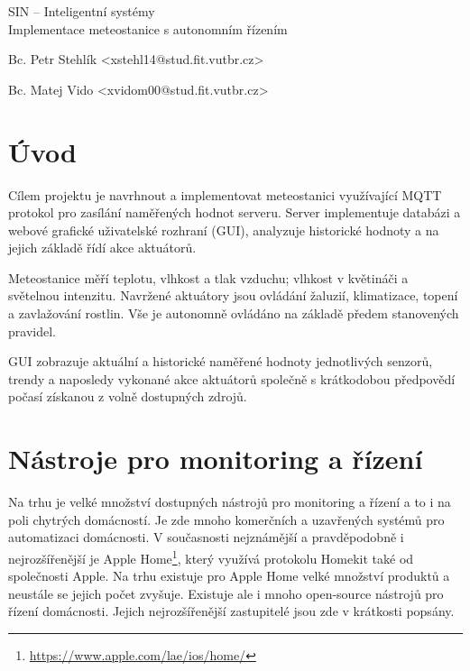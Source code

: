 \documentclass[11pt,a4paper]{article}
\begin{document}
\begin{center}
	\LARGE{SIN -- Inteligentní systémy}\\
	\Large{Implementace meteostanice s autonomním řízením}
	\vspace{0.5cm}

    \begin{centering}
        \small{Bc. Petr Stehlík <xstehl14@stud.fit.vutbr.cz>}
    \end{centering}

    \begin{centering}
        \small{Bc. Matej Vido <xvidom00@stud.fit.vutbr.cz>}
    \end{centering}

	\vspace{0.2cm}

\end{center}

\section{Úvod}
Cílem projektu je navrhnout a implementovat meteostanici využívající MQTT protokol pro zasílání naměřených hodnot serveru. Server implementuje databázi a webové grafické uživatelské rozhraní (GUI), analyzuje historické hodnoty a na jejich základě řídí akce aktuátorů.

Meteostanice měří teplotu, vlhkost a tlak vzduchu; vlhkost v květináči a světelnou intenzitu. Navržené aktuátory jsou ovládání žaluzií, klimatizace, topení a zavlažování rostlin. Vše je autonomně ovládáno na základě předem stanovených pravidel.

GUI zobrazuje aktuální a historické naměřené hodnoty jednotlivých senzorů, trendy a naposledy vykonané akce aktuátorů společně s krátkodobou předpovědí počasí získanou z volně dostupných zdrojů.

\section{Nástroje pro monitoring a řízení}
Na trhu je velké množství dostupných nástrojů pro monitoring a řízení a to i na poli chytrých domácností. Je zde mnoho komerčních a uzavřených systémů pro automatizaci domácnosti. V současnosti nejznámější a pravděpodobně i nejrozšířenější je Apple Home\footnote{\url{https://www.apple.com/lae/ios/home/}}, který využívá protokolu Homekit také od společnosti Apple. Na trhu existuje pro Apple Home velké množství produktů a neustále se jejich počet zvyšuje. Existuje ale i mnoho open-source nástrojů pro řízení domácnosti. Jejich nejrozšířenější zastupitelé jsou zde v krátkosti popsány.
\end{document}
